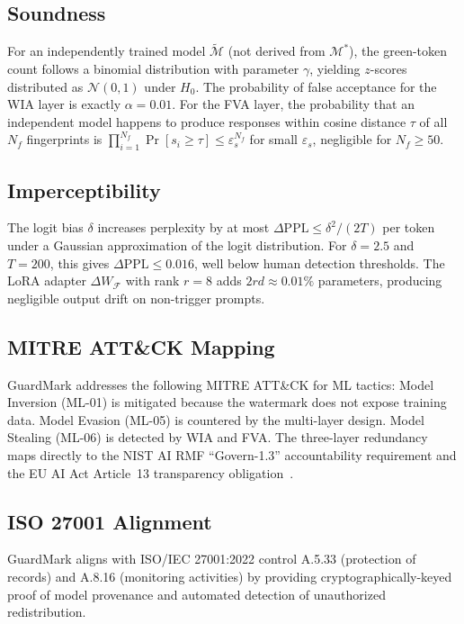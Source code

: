 \documentclass[journal,compsoc]{IEEEtran}
\newcommand{\M}{\mathcal{M}}
\newcommand{\F}{\mathcal{F}}
\begin{document}
\subsection{Soundness}

For an independently trained model $\tilde{\M}$ (not derived from $\M^*$),
the green-token count follows a binomial distribution with parameter $\gamma$,
yielding $z$-scores distributed as $\mathcal{N}(0,1)$ under $H_0$. The
probability of false acceptance for the WIA layer is exactly $\alpha = 0.01$.
For the FVA layer, the probability that an independent model happens to produce
responses within cosine distance $\tau$ of all $N_f$ fingerprints is
$\prod_{i=1}^{N_f} \Pr[s_i \geq \tau] \leq \varepsilon_s^{N_f}$ for small
$\varepsilon_s$, negligible for $N_f \geq 50$.

\subsection{Imperceptibility}

The logit bias $\delta$ increases perplexity by at most
$\Delta\mathrm{PPL} \leq \delta^2 / (2T)$ per token under a Gaussian
approximation of the logit distribution. For $\delta = 2.5$ and $T = 200$,
this gives $\Delta\mathrm{PPL} \leq 0.016$, well below human detection
thresholds. The LoRA adapter $\Delta W_\F$ with rank $r = 8$ adds
$2rd \approx 0.01\%$ parameters, producing negligible output drift on
non-trigger prompts.

\subsection{MITRE ATT\&CK Mapping}

GuardMark addresses the following MITRE ATT\&CK for ML tactics: Model
Inversion (ML-01) is mitigated because the watermark does not expose training
data. Model Evasion (ML-05) is countered by the multi-layer design. Model
Stealing (ML-06) is detected by WIA and FVA. The three-layer redundancy maps
directly to the NIST AI RMF ``Govern-1.3'' accountability requirement and the
EU AI Act Article~13 transparency obligation~\cite{nist2023ai,eu2024aiact}.

\subsection{ISO 27001 Alignment}

GuardMark aligns with ISO/IEC 27001:2022 control A.5.33 (protection of records)
and A.8.16 (monitoring activities) by providing cryptographically-keyed proof
of model provenance and automated detection of unauthorized redistribution.
\end{document}
